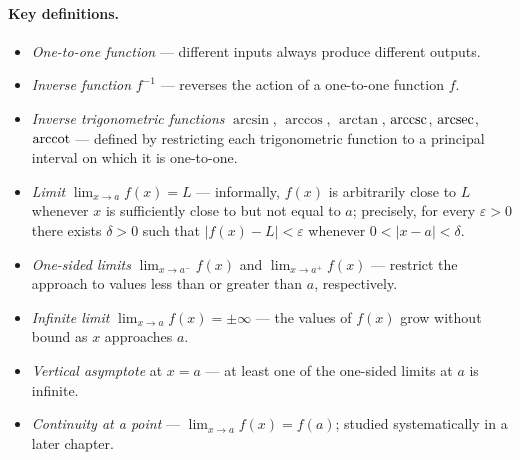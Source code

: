 \paragraph{Key definitions.}
\begin{itemize}
    \item \emph{One-to-one function} --- different inputs always produce different outputs.
    \item \emph{Inverse function} \(f^{-1}\) --- reverses the action of a one-to-one function \(f\).
    \item \emph{Inverse trigonometric functions} \(\arcsin\), \(\arccos\), \(\arctan\), \(\operatorname{arccsc}\), \(\operatorname{arcsec}\), \(\operatorname{arccot}\) --- defined by restricting each trigonometric function to a principal interval on which it is one-to-one.
    \item \emph{Limit} \(\lim_{x \to a} f(x) = L\) --- informally, \(f(x)\) is arbitrarily close to \(L\) whenever \(x\) is sufficiently close to but not equal to \(a\); precisely, for every \(\varepsilon > 0\) there exists \(\delta > 0\) such that \(|f(x) - L| < \varepsilon\) whenever \(0 < |x - a| < \delta\).
    \item \emph{One-sided limits} \(\lim_{x \to a^{-}} f(x)\) and \(\lim_{x \to a^{+}} f(x)\) --- restrict the approach to values less than or greater than \(a\), respectively.
    \item \emph{Infinite limit} \(\lim_{x \to a} f(x) = \pm\infty\) --- the values of \(f(x)\) grow without bound as \(x\) approaches \(a\).
    \item \emph{Vertical asymptote} at \(x = a\) --- at least one of the one-sided limits at \(a\) is infinite.
    \item \emph{Continuity at a point} --- \(\lim_{x \to a} f(x) = f(a)\); studied systematically in a later chapter.
\end{itemize}

